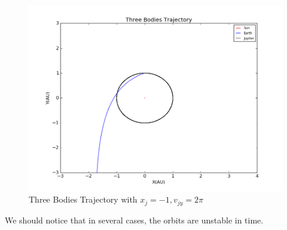 \documentclass[10pt,a4paper]{article}
\begin{document}
    \begin{figure}[htbp]
    	\centering
    	\includegraphics[width=5in]{threebodies_4.png}
    	\caption{Three Bodies Trajectory with $x_j=-1, v_{jy}=2\pi$}
    \end{figure}
    We should notice that in several cases, the orbits are unstable in time.
    
\end{document}
